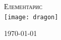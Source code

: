 \begin{titlepage}
\begin{center}

\textsc{\Huge Елементарис}\\[1.5cm]
\texttt{[image: dragon]}~
\\[1cm]

\vfill

\footnotesize \today \normalsize

\end{center}
\end{titlepage}

